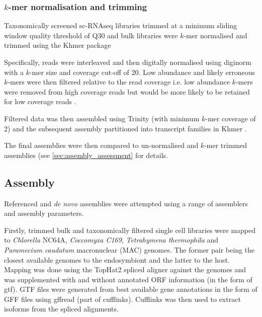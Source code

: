 \subsubsection{\(k\)-mer normalisation and trimming}

Taxonomically screened sc-RNAseq libraries trimmed at a minimum sliding window quality
threshold of Q30 and bulk libraries were \(k\)-mer normalised and trimmed using the Khmer package \citep{Crusoe2015}

Specifically, reads were interleaved \citep{Doring2008} and then digitally normalised using diginorm \citep{Brown2012}
with a \(k\)-mer size and coverage cut-off of 20.  Low abundance and likely erroneous
\(k\)-mers were then filtered relative to the read coverage i.e. low abundance \(k\)-mers were removed
from high coverage reads but would be more likely to be retained for low coverage reads \citep{Zhang2015,Zhang2014}.  

Filtered data was then assembled using Trinity (with minimum \(k\)-mer coverage of 2) 
and the subsequent assembly partitioned into transcript families in Khmer \citep{Pell2012}.

The final assemblies were then compared to un-normalised and \(k\)-mer trimmed assemblies 
(see \cref{sec:assembly_assessment} for details.


\subsection{Assembly}

Referenced and \textit{de novo} assemblies were attempted using a range of assemblers
and assembly parameters.

Firstly, trimmed bulk and taxonomically filtered single cell libraries
were mapped to \textit{Chlorella} NC64A, \textit{Coccomyxa C169}, 
\textit{Tetrahymena thermophila} and \textit{Paramecium caudatum} macronuclear (MAC) genomes.
The former pair being the closest available genomes to the endosymbiont and the latter to the host.
Mapping was done using the TopHat2 spliced aligner \citep{Kim2013} against
the genomes and was supplemented with and without annotated ORF information (in the form of gtf).
GTF files were generated from best available gene annotations in the form of GFF files using gffread (part of
cufflinks).
Cufflinks \citep{Trapnell2011} was then used to extract isoforms from the spliced alignments.

